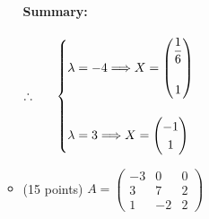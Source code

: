 \documentclass[fleqn]{article}
\begin{document}
\begin{enumerate}
\begin{itemize}
{          \\
          \textbf{Summary:}
          \\
          \\
          $
            \therefore ~~~~~ \begin{cases}
              \lambda=-4 \Longrightarrow X=\begin{pmatrix}
                \dfrac{1}{6}
                \\
                \\
                1
              \end{pmatrix}
              \\
              \\
              \lambda=3 \Longrightarrow X=\begin{pmatrix}
                -1
                \\
                1
              \end{pmatrix}
            \end{cases}
            \\
            \\
          $
        }
  
      \item (15 points) $A=\begin{pmatrix}
        -3 & 0 & 0
        \\
        3 & 7 & 2
        \\
        1 & -2 & 2
      \end{pmatrix}$


\end{itemize}
\end{enumerate}
\end{document}
